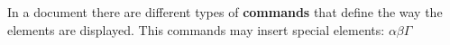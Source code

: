 \documentclass{article}
\begin{document}
In a document there are different types of \textbf{commands} 
that define the way the elements are displayed. This 
commands may insert special elements: $\alpha \beta \Gamma$
\end{document}
